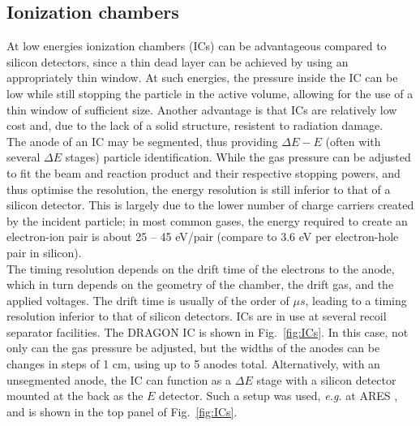 \subsection{Ionization chambers}
At low energies ionization chambers (ICs) can be advantageous compared to silicon detectors, since a thin dead layer can be achieved by using an appropriately thin window. At such energies, the pressure inside the IC can be low while still stopping the particle in the active volume, allowing for the use of a thin window of sufficient size. Another advantage is that ICs are relatively low cost and, due to the lack of a solid structure, resistent to radiation damage.\\
The anode of an IC may be segmented, thus providing $\Delta{}E-E$ (often with several $\Delta{}E$ stages) particle identification. While the gas pressure can be adjusted to fit the beam and reaction product and their respective stopping powers, and thus optimise the resolution, the energy resolution is still inferior to that of a silicon detector. This is largely due to the lower number of charge carriers created by the incident particle; in most common gases, the energy required to create an electron-ion pair is about 25 -- 45 eV/pair (compare to 3.6 eV per electron-hole pair in silicon).\\
The timing resolution depends on the drift time of the electrons to the anode, which in turn depends on the geometry of the chamber, the drift gas, and the applied voltages. The drift time is usually of the order of $\unit{\mu{}s}$, leading to a timing resolution inferior to that of silicon detectors. 
ICs are in use at several recoil separator facilities. The DRAGON IC is shown in Fig.\ \ref{fig:ICs}. In this case, not only can the gas pressure be adjusted, but the widths of the anodes can be changes in steps of 1 cm, using up to 5 anodes total.
Alternatively, with an unsegmented anode, the IC can function as a $\Delta{}E$ stage with a silicon detector mounted at the back as the $E$ detector. Such a setup was used, {\it e.g.} at ARES \cite{coud03}, and is shown in the top panel of Fig.\ \ref{fig:ICs}.
